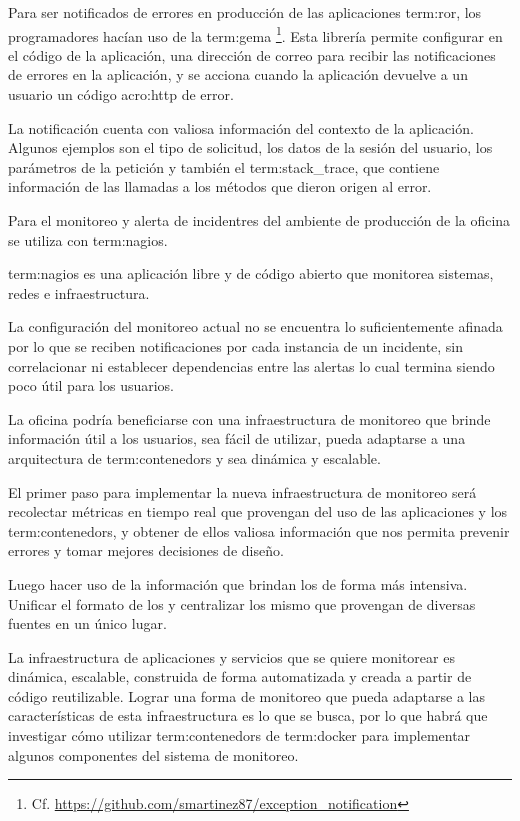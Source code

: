 Para ser notificados de errores en producción de las aplicaciones
\gls{term:ror}, los programadores hacían uso de la \gls{term:gema}
\footnote{Cf.
\url{https://github.com/smartinez87/exception_notification}}. Esta librería
permite configurar en el código de la aplicación, una dirección de correo para
recibir las notificaciones de errores en la aplicación, y se acciona cuando la
aplicación devuelve a un usuario un código \gls{acro:http} de error.

La notificación cuenta con valiosa información del contexto de la aplicación.
Algunos ejemplos son el tipo de solicitud, los datos de la sesión del usuario,
los parámetros de la petición y también el \gls{term:stack_trace}, que contiene
información de las llamadas a los métodos que dieron origen al error.

Para el monitoreo y alerta de incidentres del ambiente de producción de la
oficina se utiliza con \gls{term:nagios}.

\gls{term:nagios} es una aplicación libre y de código abierto que monitorea
sistemas, redes e infraestructura.

La configuración del monitoreo actual no se encuentra lo suficientemente
afinada por lo que se reciben notificaciones por cada instancia de un incidente,
sin correlacionar ni establecer dependencias entre las alertas lo cual termina
siendo poco útil para los usuarios.

La oficina podría beneficiarse con una infraestructura de monitoreo que brinde
información útil a los usuarios, sea fácil de utilizar, pueda adaptarse a una
arquitectura de \glspl{term:contenedor} y sea dinámica y escalable.

El primer paso para implementar la nueva infraestructura de monitoreo será
recolectar métricas en tiempo real que provengan del uso de las aplicaciones y
los \glspl{term:contenedor}, y obtener de ellos valiosa información que nos
permita prevenir errores y tomar mejores decisiones de diseño.

Luego hacer uso de la información que brindan los  de forma más
intensiva. Unificar el formato de los  y centralizar los mismo que
provengan de diversas fuentes en un único lugar.

La infraestructura de aplicaciones y servicios que se quiere monitorear es
dinámica, escalable, construida de forma automatizada y creada a partir de
código reutilizable. Lograr una forma de monitoreo que pueda adaptarse a las
características de esta infraestructura es lo que se busca, por lo que habrá
que investigar cómo utilizar \glspl{term:contenedor} de \gls{term:docker} para
implementar algunos componentes del sistema de monitoreo.

